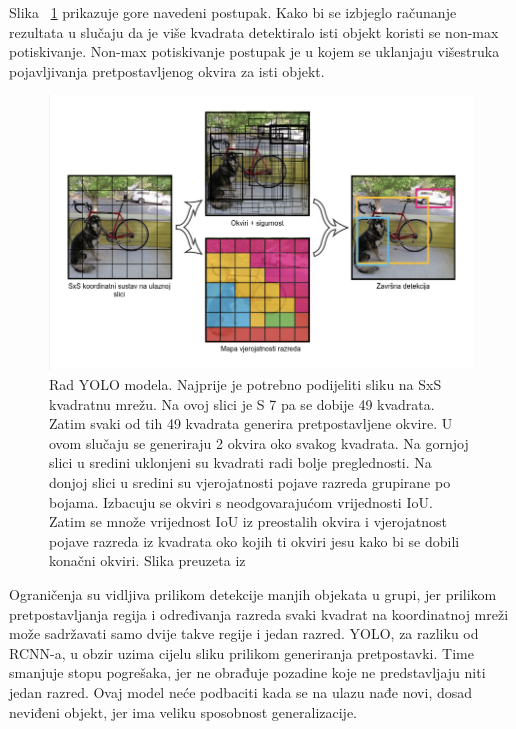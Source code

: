 Slika ~\ref{fig:Rad YOLO modela} prikazuje gore navedeni postupak.
Kako bi se izbjeglo računanje rezultata u slučaju 
da je više kvadrata detektiralo isti objekt koristi se non-max potiskivanje. Non-max potiskivanje postupak je u kojem se uklanjaju višestruka pojavljivanja pretpostavljenog okvira za isti objekt.
\begin{figure}[htb]
    \centering
    \includegraphics[width=12cm]{img/YOLO-process.png}
    \caption{Rad YOLO modela. Najprije je potrebno podijeliti sliku na SxS kvadratnu mrežu. Na ovoj slici je S 7 pa se dobije 49 kvadrata.
    Zatim svaki od tih 49 kvadrata generira pretpostavljene okvire. U ovom slučaju se generiraju 2 okvira oko svakog kvadrata. Na gornjoj slici u 
    sredini uklonjeni su kvadrati radi bolje preglednosti. Na donjoj slici u sredini su vjerojatnosti pojave razreda grupirane po bojama. Izbacuju se 
    okviri s neodgovarajućom vrijednosti IoU. Zatim se množe vrijednost IoU iz preostalih okvira i vjerojatnost pojave razreda iz kvadrata oko kojih ti okviri jesu
    kako bi se dobili konačni okviri. 
     Slika preuzeta iz \citep{DBLP:journals/corr/RedmonDGF15}}
    \label{fig:Rad YOLO modela} 
\end{figure}

Ograničenja su vidljiva prilikom detekcije manjih objekata u grupi, jer prilikom pretpostavljanja regija  i određivanja 
razreda svaki kvadrat na koordinatnoj mreži može sadržavati samo dvije takve regije i jedan razred. 
YOLO, za razliku od RCNN-a, u obzir uzima cijelu sliku prilikom generiranja pretpostavki. Time smanjuje
stopu pogrešaka, jer ne obrađuje pozadine koje ne predstavljaju niti jedan razred. Ovaj model neće podbaciti kada se na ulazu nađe novi, dosad neviđeni 
objekt, jer ima veliku sposobnost generalizacije.\citep{DBLP:journals/corr/RedmonDGF15}   

